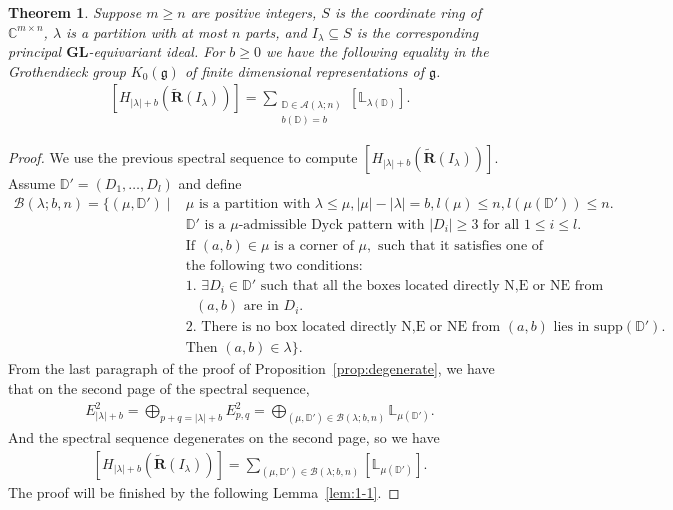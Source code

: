 \documentclass[12pt]{amsart}
\newtheorem{thm}{Theorem}[section]
\theoremstyle{definition}
\theoremstyle{remark}
\newcommand{\cA}{\mathcal{A}}
\newcommand{\cB}{\mathcal{B}}
\newcommand{\bbC}{\mathbb{C}}
\newcommand{\bbD}{\mathbb{D}}
\newcommand{\bbL}{\mathbb{L}}
\newcommand{\bR}{\mathbf{R}}
\newcommand{\fg}{\mathfrak{g}}
\newcommand{\dsum}{\bigoplus}
\newcommand{\GL}{\mathbf{GL}}
\newcommand{\DS}{\displaystyle}
\numberwithin{equation}{section}
\begin{document}
\begin{thm} \label{thm: main}
Suppose $m \geq n$ are positive integers, $S$ is the coordinate ring of $\bbC^{m \times n}$, $\lambda$ is a partition with at most $n$ parts, and $I_{\lambda} \subseteq S$ is the corresponding principal $\GL$-equivariant ideal. For $b \geq 0$ we have the following equality in the Grothendieck group $K_0(\fg)$ of finite dimensional representations of $\fg$.
\begin{align}
    \DS [H_{|\lambda|+b}(\tilde{\bR}(I_{\lambda}))] = \sum_{\substack{\bbD \in \cA(\lambda;n) \\ b(\bbD) = b}} [\bbL_{\lambda(\bbD)}].
\end{align}
\end{thm}

\begin{proof}
We use the previous spectral sequence to compute $[H_{|\lambda|+b}(\tilde{\bR}(I_{\lambda}))]$. Assume $\bbD' = (D_1,\ldots,D_l)$ and define
\begin{align*}
\cB(\lambda;b,n) = \{ (\mu,\bbD') \mid & \mu \text{ is a partition with } \lambda \leq \mu, |\mu| - |\lambda| = b, l(\mu) \leq n, l(\mu(\bbD')) \leq n. \\
& \bbD' \text{ is a $\mu$-admissible Dyck pattern with } |D_i| \geq 3 \text{ for all } 1 \leq i \leq l. \\
& \text{If } (a,b) \in \mu \text{ is a corner of } \mu, \text{ such that  it satisfies one of } \\
& \text{the following two conditions:} \\ 
&  \text{1. } \exists D_i \in \bbD' \text{ such that all the boxes located directly N,E or NE from } \\
& \text{ $(a,b)$ are in $D_i$.} \\
&  \text{2. There is no box located directly N,E or NE from $(a,b)$ lies in supp$(\bbD')$.} \\ 
& \text{Then } (a,b) \in \lambda \}.
\end{align*}
From the last paragraph of the proof of Proposition~\ref{prop:degenerate}, we have that on the second page of the spectral sequence,
\begin{align*}
\DS E^2_{|\lambda|+b} = \dsum_{p + q = |\lambda|+b} E^2_{p,q} = \dsum_{(\mu,\bbD') \in \cB(\lambda;b,n)} \bbL_{\mu(\bbD')}.    
\end{align*}
And the spectral sequence degenerates on the second page, so we have
\begin{align}
\DS    [H_{|\lambda|+b}(\tilde{\bR}(I_{\lambda}))] = \sum_{(\mu,\bbD') \in \cB(\lambda;b,n)} [\bbL_{\mu(\bbD')}].
\end{align}
The proof will be finished by the following Lemma~\ref{lem:1-1}.
\end{proof}
\end{document}
